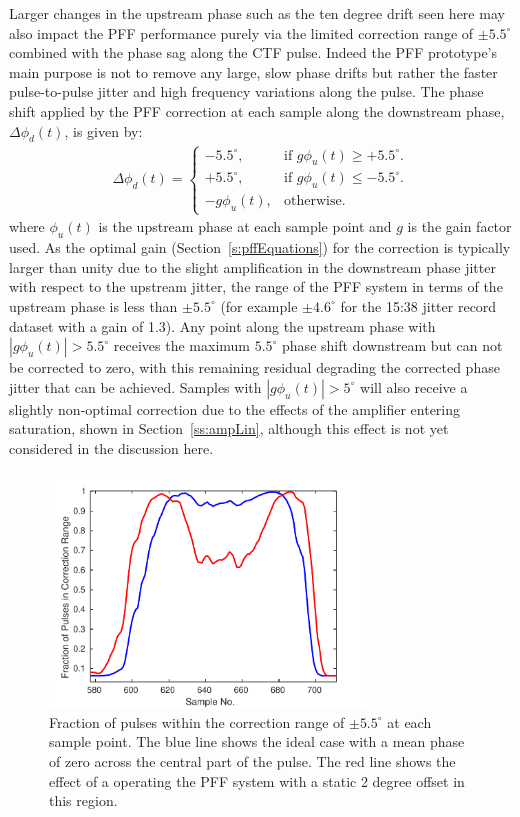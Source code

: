 Larger changes in the upstream phase such as the ten degree drift seen here may also impact the PFF performance purely via the limited correction range of \(\pm5.5^\circ\) combined with the phase sag along the CTF pulse. Indeed the PFF prototype's main purpose is not to remove any large, slow phase drifts but rather the faster pulse-to-pulse jitter and high frequency variations along the pulse. The phase shift applied by the PFF correction at each sample along the downstream phase, \(\Delta\phi_d(t)\), is given by:
\begin{eqnarray}
	\Delta\phi_d(t) = \begin{cases}
	-5.5^\circ, &  \text{if $g\phi_u(t) \geq+5.5^\circ$.}\\
	+5.5^\circ, &  \text{if $g\phi_u(t)\leq-5.5^\circ$}.\\
	-g\phi_u(t), &  \text{otherwise.}
	\end{cases}
	\label{e:limCorrection}
\end{eqnarray}
where \(\phi_u(t)\) is the upstream phase at each sample point and \(g\) is the gain factor used. As the optimal gain (Section~\ref{s:pffEquations}) for the correction is typically larger than unity due to the slight amplification in the downstream phase jitter with respect to the upstream jitter, the range of the PFF system in terms of the upstream phase is less than \(\pm5.5^\circ\) (for example \(\pm4.6^\circ\) for the 15:38 jitter record dataset with a gain of 1.3). Any point along the upstream phase with \(|g\phi_u(t)| > 5.5^\circ\) receives the maximum \(5.5^\circ\) phase shift downstream but can not be corrected to zero, with this remaining residual degrading the corrected phase jitter that can be achieved. Samples with  \(|g\phi_u(t)| > 5^\circ\) will also receive a slightly non-optimal correction due to the effects of the amplifier entering saturation, shown in Section~\ref{ss:ampLin}, although this effect is not yet considered in the discussion here.


\begin{figure}
  \centering
  \includegraphics[width=0.75\textwidth]{Figures/feedforward/longFF_fractInRange}
  \caption{Fraction of pulses within the correction range of \(\pm 5.5^\circ\) at each sample point. The blue line shows the ideal case with a mean phase of zero across the central part of the pulse. The red line shows the effect of a operating the PFF system with a static 2 degree offset in this region.}
  \label{f:longFF_fractInRange}
\end{figure}


